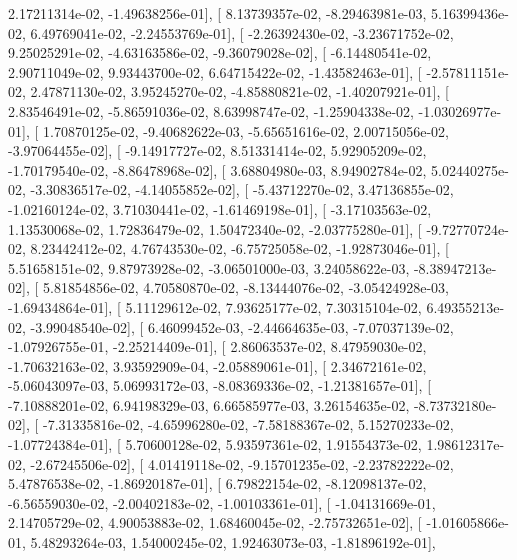 \documentclass{article}
\begin{document}
          2.17211314e-02,  -1.49638256e-01],
       [  8.13739357e-02,  -8.29463981e-03,   5.16399436e-02,
          6.49769041e-02,  -2.24553769e-01],
       [ -2.26392430e-02,  -3.23671752e-02,   9.25025291e-02,
         -4.63163586e-02,  -9.36079028e-02],
       [ -6.14480541e-02,   2.90711049e-02,   9.93443700e-02,
          6.64715422e-02,  -1.43582463e-01],
       [ -2.57811151e-02,   2.47871130e-02,   3.95245270e-02,
         -4.85880821e-02,  -1.40207921e-01],
       [  2.83546491e-02,  -5.86591036e-02,   8.63998747e-02,
         -1.25904338e-02,  -1.03026977e-01],
       [  1.70870125e-02,  -9.40682622e-03,  -5.65651616e-02,
          2.00715056e-02,  -3.97064455e-02],
       [ -9.14917727e-02,   8.51331414e-02,   5.92905209e-02,
         -1.70179540e-02,  -8.86478968e-02],
       [  3.68804980e-03,   8.94902784e-02,   5.02440275e-02,
         -3.30836517e-02,  -4.14055852e-02],
       [ -5.43712270e-02,   3.47136855e-02,  -1.02160124e-02,
          3.71030441e-02,  -1.61469198e-01],
       [ -3.17103563e-02,   1.13530068e-02,   1.72836479e-02,
          1.50472340e-02,  -2.03775280e-01],
       [ -9.72770724e-02,   8.23442412e-02,   4.76743530e-02,
         -6.75725058e-02,  -1.92873046e-01],
       [  5.51658151e-02,   9.87973928e-02,  -3.06501000e-03,
          3.24058622e-03,  -8.38947213e-02],
       [  5.81854856e-02,   4.70580870e-02,  -8.13444076e-02,
         -3.05424928e-03,  -1.69434864e-01],
       [  5.11129612e-02,   7.93625177e-02,   7.30315104e-02,
          6.49355213e-02,  -3.99048540e-02],
       [  6.46099452e-03,  -2.44664635e-03,  -7.07037139e-02,
         -1.07926755e-01,  -2.25214409e-01],
       [  2.86063537e-02,   8.47959030e-02,  -1.70632163e-02,
          3.93592909e-04,  -2.05889061e-01],
       [  2.34672161e-02,  -5.06043097e-03,   5.06993172e-03,
         -8.08369336e-02,  -1.21381657e-01],
       [ -7.10888201e-02,   6.94198329e-03,   6.66585977e-03,
          3.26154635e-02,  -8.73732180e-02],
       [ -7.31335816e-02,  -4.65996280e-02,  -7.58188367e-02,
          5.15270233e-02,  -1.07724384e-01],
       [  5.70600128e-02,   5.93597361e-02,   1.91554373e-02,
          1.98612317e-02,  -2.67245506e-02],
       [  4.01419118e-02,  -9.15701235e-02,  -2.23782222e-02,
          5.47876538e-02,  -1.86920187e-01],
       [  6.79822154e-02,  -8.12098137e-02,  -6.56559030e-02,
         -2.00402183e-02,  -1.00103361e-01],
       [ -1.04131669e-01,   2.14705729e-02,   4.90053883e-02,
          1.68460045e-02,  -2.75732651e-02],
       [ -1.01605866e-01,   5.48293264e-03,   1.54000245e-02,
          1.92463073e-03,  -1.81896192e-01],
\end{document}
